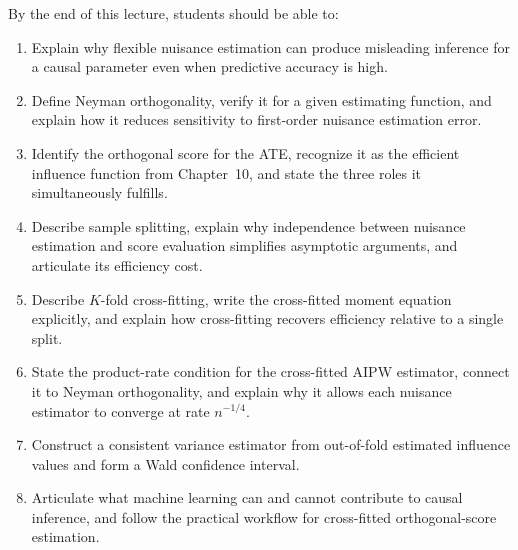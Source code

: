 \documentclass[master.tex]{subfiles}
\begin{document}

\begin{tcolorbox}[defstyle, title={Learning Objectives}]
By the end of this lecture, students should be able to:
\begin{enumerate}
  \item Explain why flexible nuisance estimation can produce misleading
    inference for a causal parameter even when predictive accuracy
    is high.
  \item Define Neyman orthogonality, verify it for a given estimating
    function, and explain how it reduces sensitivity to
    first-order nuisance estimation error.
  \item Identify the orthogonal score for the ATE, recognize it as
    the efficient influence function from Chapter~10, and state the
    three roles it simultaneously fulfills.
  \item Describe sample splitting, explain why independence between
    nuisance estimation and score evaluation simplifies
    asymptotic arguments, and articulate its efficiency cost.
  \item Describe $K$-fold cross-fitting, write the cross-fitted
    moment equation explicitly, and explain how cross-fitting
    recovers efficiency relative to a single split.
  \item State the product-rate condition for the cross-fitted AIPW
    estimator, connect it to Neyman orthogonality, and explain
    why it allows each nuisance estimator to converge at rate
    $n^{-1/4}$.
  \item Construct a consistent variance estimator from
    out-of-fold estimated influence values and form a
    Wald confidence interval.
  \item Articulate what machine learning can and cannot contribute
    to causal inference, and follow the practical workflow for
    cross-fitted orthogonal-score estimation.
\end{enumerate}
\end{tcolorbox}
\end{document}
